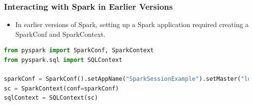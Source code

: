 \begin{frame}[fragile]
    \frametitle{Interacting with Spark in Earlier Versions}

    \begin{itemize}
        \item In earlier versions of Spark, setting up a Spark application required creating a SparkConf and SparkContext.
    \end{itemize}

    \begin{lstlisting}[language=Python,label={lst:pyspark-spark-context},caption={Create SparkContext in old Spark versions}]
from pyspark import SparkConf, SparkContext
from pyspark.sql import SQLContext

sparkConf = SparkConf().setAppName("SparkSessionExample").setMaster("local")
sc = SparkContext(conf=sparkConf)
sqlContext = SQLContext(sc)
    \end{lstlisting}

\end{frame}

